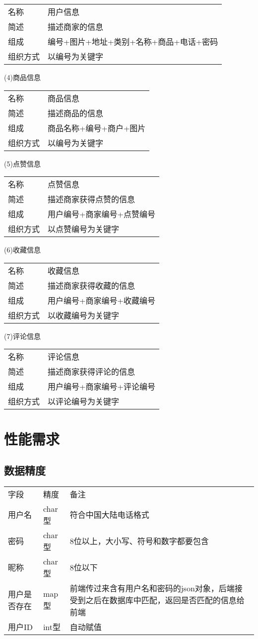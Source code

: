 \begin{longtable}[]{@{}ll@{}}
\toprule
名称 & 用户信息\tabularnewline
简述 & 描述商家的信息\tabularnewline
组成 & 编号+图片+地址+类别+名称+商品+电话+密码\tabularnewline
组织方式 & 以编号为关键字\tabularnewline
\bottomrule
\end{longtable}

(4)商品信息

\begin{longtable}[]{@{}ll@{}}
\toprule
名称 & 商品信息\tabularnewline
简述 & 描述商品的信息\tabularnewline
组成 & 商品名称+编号+商户+图片\tabularnewline
组织方式 & 以编号为关键字\tabularnewline
\bottomrule
\end{longtable}

(5)点赞信息

\begin{longtable}[]{@{}ll@{}}
\toprule
名称 & 点赞信息\tabularnewline
简述 & 描述商家获得点赞的信息\tabularnewline
组成 & 用户编号+商家编号+点赞编号\tabularnewline
组织方式 & 以点赞编号为关键字\tabularnewline
\bottomrule
\end{longtable}

(6)收藏信息

\begin{longtable}[]{@{}ll@{}}
\toprule
名称 & 收藏信息\tabularnewline
简述 & 描述商家获得收藏的信息\tabularnewline
组成 & 用户编号+商家编号+收藏编号\tabularnewline
组织方式 & 以收藏编号为关键字\tabularnewline
\bottomrule
\end{longtable}

(7)评论信息

\begin{longtable}[]{@{}ll@{}}
\toprule
名称 & 评论信息\tabularnewline
简述 & 描述商家获得评论的信息\tabularnewline
组成 & 用户编号+商家编号+评论编号\tabularnewline
组织方式 & 以评论编号为关键字\tabularnewline
\bottomrule
\end{longtable}

\section{性能需求}

\subsection{数据精度}

\begin{longtable}[]{@{}lll@{}}
\toprule
字段 & 精度 & 备注\tabularnewline
用户名 & char型 & 符合中国大陆电话格式\tabularnewline
密码 & char型 & 8位以上，大小写、符号和数字都要包含\tabularnewline
昵称 & char型 & 8位以下\tabularnewline
用户是否存在 & map型 &
前端传过来含有用户名和密码的json对象，后端接受到之后在数据库中匹配，返回是否匹配的信息给前端\tabularnewline
用户ID & int型 & 自动赋值\tabularnewline
\bottomrule
\end{longtable}

